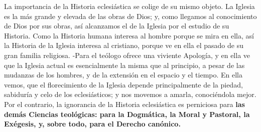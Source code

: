 \raggedbottom{} \documentclass[12pt, a4paper, openany]{book} %
\begin{document}
La importancia de la Historia eclesiástica se colige de su mismo objeto. La Iglesia es la más grande y elevada de las obras de Dios; y, como llegamos al conocimiento de Dios por sus obras, así alcanzamos el de la Iglesia por el estudio de su Historia. Como la Historia humana interesa al hombre porque se mira en ella, así la Historia de la Iglesia interesa al cristiano, porque ve en ella el pasado de su gran familia religiosa. -Para el teólogo ofrece una viviente Apología, y en ella ve que la Iglesia actual es esencialmente la misma que al principio, a pesar de las mudanzas de los hombres, y de la extensión en el espacio y el tiempo. En ella vemos, que el florecimiento de la Iglesia depende principalmente de la piedad, sabiduría y celo de los eclesiásticos; y nos movemos a amarla, conociéndola mejor. Por el contrario, la ignorancia de la Historia eclesiástica es perniciosa para \textbf{las demás Ciencias teológicas: para la Dogmática, la Moral y Pastoral, la Exégesis, y, sobre todo, para el Derecho canónico.}
\end{document}
